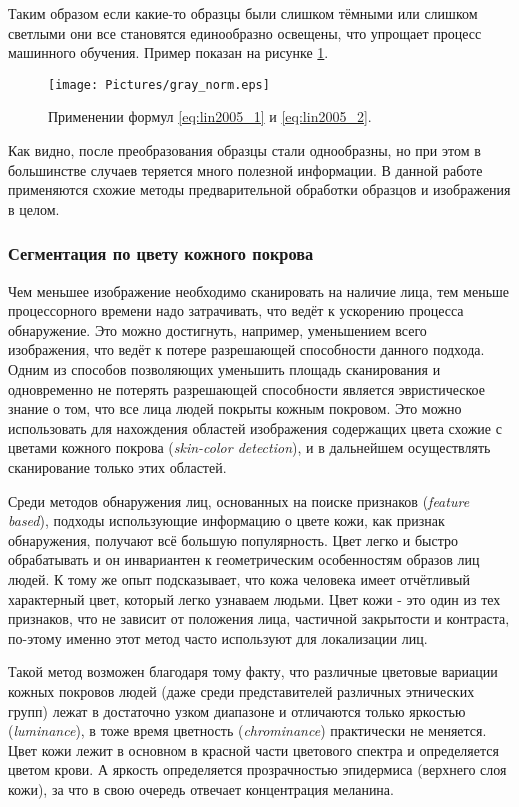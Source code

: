 \documentclass[12pt]{report}
\begin{document}
Таким образом если какие-то образцы были слишком тёмными или слишком светлыми они все становятся единообразно 
освещены, что упрощает процесс машинного обучения. Пример показан на рисунке \ref{fig:gray_norm}.

\begin{figure}[h]
	\centering
	\texttt{[image: Pictures/gray\_norm.eps]}
	\caption{Применении формул \ref{eq:lin2005_1} и \ref{eq:lin2005_2}.}
	\label{fig:gray_norm}
\end{figure}

Как видно, после преобразования образцы стали однообразны, но при этом в большинстве случаев теряется много 
полезной 
информации. В данной работе применяются схожие методы предварительной обработки образцов и изображения в целом. 

\subsubsection{Сегментация по цвету кожного покрова}
\label{sec:skin_segm}
Чем меньшее изображение необходимо сканировать на наличие лица, тем меньше процессорного времени надо 
затрачивать, что ведёт к ускорению процесса обнаружение. Это можно достигнуть, например, уменьшением всего 
изображения, что 
ведёт к потере разрешающей способности данного подхода. Одним из способов позволяющих уменьшить площадь 
сканирования и одновременно не потерять разрешающей способности является эвристическое знание о том, что все лица 
людей покрыты кожным покровом. Это можно использовать для нахождения областей изображения содержащих цвета схожие с 
цветами кожного покрова (\textit{skin-color detection}), и в дальнейшем осуществлять сканирование только этих 
областей.

Среди методов обнаружения лиц, основанных на поиске признаков (\textit{feature based}), подходы использующие 
информацию 
о цвете кожи, как признак обнаружения, получают всё большую популярность. Цвет легко и быстро обрабатывать и он 
инвариантен к геометрическим особенностям образов лиц людей. К тому же опыт подсказывает, что кожа человека 
имеет отчётливый характерный цвет, который легко узнаваем людьми. \citep{vezhnevets2003survey} Цвет кожи - это один 
из тех признаков, что не зависит от положения лица, частичной закрытости и контраста, по-этому именно этот метод 
часто используют для локализации лиц. \citep{ruangyam2009efficient}

Такой метод возможен благодаря тому факту, что различные цветовые вариации кожных покровов людей (даже среди 
представителей различных этнических групп) лежат в достаточно узком диапазоне и отличаются только яркостью (\textit
{luminance}), в тоже время цветность (\textit{chrominance}) практически не меняется. Цвет кожи лежит в основном в 
красной части цветового спектра и определяется цветом крови. А яркость определяется прозрачностью эпидермиса 
(верхнего слоя кожи), за что в свою очередь отвечает концентрация меланина. \citep{xu2006color} %
\end{document}
